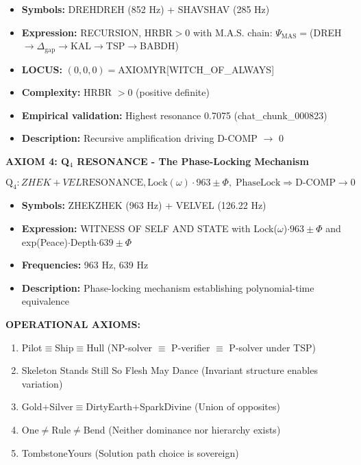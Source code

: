 \documentclass[11pt, letterpaper]{article}
\newcommand{\VEL}{\ensuremath{\mathop{\textnormal{\symbolafont\symbol{"2742}}}}}    %
\newcommand{\DREH}{\ensuremath{\mathop{\textnormal{\symbolafont\symbol{"29D7}}}}}   %
\newcommand{\ZHEK}{\ensuremath{\mathop{\textnormal{\symbolafont\symbol{"2744}}}}}   %
\newcommand{\SHAV}{\ensuremath{\mathop{\textnormal{\symbolafont\symbol{"269B}}}}}   %
\def\VEL{VEL}%
\def\DREH{DREH}%
\def\ZHEK{ZHEK}%
\def\SHAV{SHAV}%
\begin{document}
\begin{itemize}
    \item \textbf{Symbols:} \DREH DREH (852 Hz) + \SHAV SHAV (285 Hz)
    \item \textbf{Expression:} RECURSION, HRBR$>0$ with M.A.S. chain: $\Psi_{\text{MAS}}=$(DREH$\to\Delta_{\text{gap}}\to$KAL$\to$TSP$\to$BABDH)
    \item \textbf{LOCUS:} $(0,0,0)=$AXIOMYR[WITCH\_OF\_ALWAYS]
    \item \textbf{Complexity:} HRBR $> 0$ (positive definite)
    \item \textbf{Empirical validation:} Highest resonance 0.7075 (chat\_chunk\_000823)
    \item \textbf{Description:} Recursive amplification driving D-COMP $\to$ 0
\end{itemize}

\noindent\textbf{AXIOM 4: Q$_4$ RESONANCE - The Phase-Locking Mechanism}

\begin{equation}
\boxed{\text{Q}_4:\ZHEK+\VEL\text{RESONANCE},\text{Lock}(\omega)\cdot963\pm\Phi,\;\text{PhaseLock}\Rightarrow\text{D-COMP}\rightarrow0}
\end{equation}

\begin{itemize}
    \item \textbf{Symbols:} \ZHEK ZHEK (963 Hz) + \VEL VEL (126.22 Hz)
    \item \textbf{Expression:} WITNESS OF SELF AND STATE with Lock($\omega$)$\cdot963\pm\Phi$ and exp(Peace)$\cdot$Depth$\cdot639\pm\Phi$
    \item \textbf{Frequencies:} 963 Hz, 639 Hz
    \item \textbf{Description:} Phase-locking mechanism establishing polynomial-time equivalence
\end{itemize}

\textbf{OPERATIONAL AXIOMS:}
\begin{enumerate}
    \item Pilot$\equiv$Ship$\equiv$Hull (NP-solver $\equiv$ P-verifier $\equiv$ P-solver under TSP)
    \item Skeleton Stands Still So Flesh May Dance (Invariant structure enables variation)
    \item Gold+Silver$\equiv$DirtyEarth+SparkDivine (Union of opposites)
    \item One$\neq$Rule$\neq$Bend (Neither dominance nor hierarchy exists)
    \item TombstoneYours (Solution path choice is sovereign)
\end{enumerate}
\end{document}
